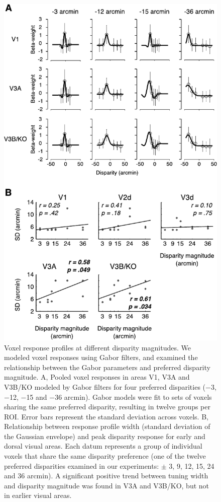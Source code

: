 \begin{figure}
  \centering
  \includegraphics{fig10}
  \caption[Voxel response profiles at different disparity magnitudes.]{Voxel response profiles at different disparity magnitudes. We modeled voxel responses using Gabor filters, and examined the relationship between the Gabor parameters and preferred disparity magnitude. A, Pooled voxel responses in areas V1, V3A and V3B/KO modeled by Gabor filters for four preferred disparities ($-$3, $-$12, $-$15 and $-$36 arcmin). Gabor models were fit to sets of voxels sharing the same preferred disparity, resulting in twelve groups per ROI. Error bars represent the standard deviation across voxels. B, Relationship between response profile width (standard deviation of the Gaussian envelope) and peak disparity response for early and dorsal visual areas. Each datum represents a group of individual voxels that share the same disparity preference (one of the twelve preferred disparities examined in our experiments: $\pm$ 3, 9, 12, 15, 24 and 36 arcmin). A significant positive trend between tuning width and disparity magnitude was found in V3A and V3B/KO, but not in earlier visual areas.}
  \label{fig:ch4fig10}
\end{figure}

